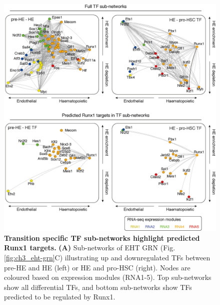 \begin{figure}[!t]
    \centering
    \includegraphics[width=\textwidth,height=\textheight,keepaspectratio]{figures/chapter3/ch3_pairwise.png}
    \caption[{Transition specific TF sub-networks highlight predicted and Runx1 targets.}]
    {\textbf{Transition specific TF sub-networks highlight predicted Runx1 targets.} 
    \textbf{(A)} Sub-networks of EHT GRN (Fig. \ref{fig:ch3_eht-grn}C) illustrating up and downregulated TFs between pre-HE and HE (left) or HE and pro-HSC (right). Nodes are coloured based on expression modules (RNA1-5). Top sub-networks show all differential TFs, and bottom sub-networks show TFs predicted to be regulated by Runx1.
    }
    \label{fig:ch3_pairwise}
\end{figure}

